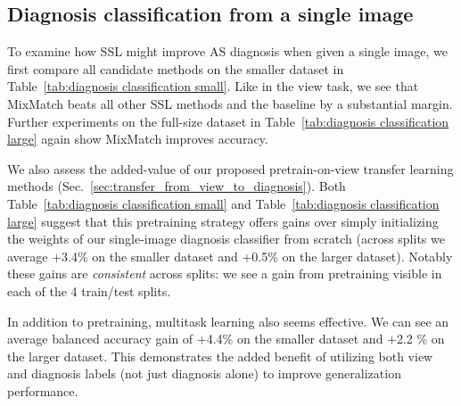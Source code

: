 \subsection{Diagnosis classification from a single image}
\label{sec:results-diagnosis-from-images}

To examine how SSL might improve AS diagnosis when given a single image, we first compare all candidate methods on the smaller dataset in Table~\ref{tab:diagnosis classification small}.
Like in the view task, we see that MixMatch beats all other SSL methods and the baseline by a substantial margin.
Further experiments on the full-size dataset in Table~\ref{tab:diagnosis classification large} again show MixMatch improves accuracy.

We also assess the added-value of our proposed pretrain-on-view transfer learning methods (Sec.~\ref{sec:transfer_from_view_to_diagnosis}).
Both Table~\ref{tab:diagnosis classification small} and Table~\ref{tab:diagnosis classification large} suggest that this pretraining strategy offers gains over simply initializing the weights of our single-image diagnosis classifier from scratch (across splits we average +3.4\% on the smaller dataset and +0.5\% on the larger dataset).
Notably these gains are \emph{consistent} across splits: we see a gain from pretraining visible in each of the 4 train/test splits.

In addition to pretraining, multitask learning also seems effective. We can see an average balanced accuracy gain of +4.4\% on the smaller dataset and +2.2 \% on the larger dataset. This demonstrates the added benefit of utilizing both view and diagnosis labels (not just diagnosis alone) to improve generalization performance.


